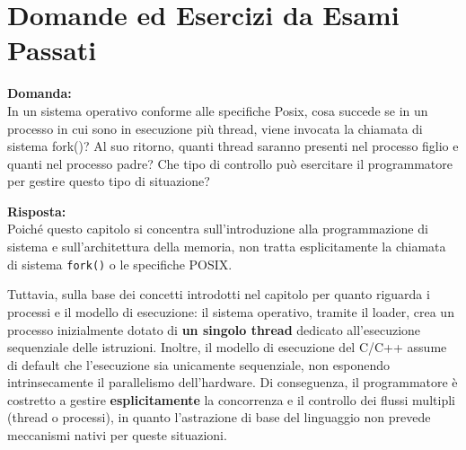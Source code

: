 \section{Domande ed Esercizi da Esami Passati}

\begin{exambox}
\textbf{Domanda:}\\
In un sistema operativo conforme alle specifiche Posix, cosa succede se in un processo in cui sono in esecuzione più thread, viene invocata la chiamata di sistema fork()? Al suo ritorno, quanti thread saranno presenti nel processo figlio e quanti nel processo padre? Che tipo di controllo può esercitare il programmatore per gestire questo tipo di situazione?

\vspace{1em}
\textbf{Risposta:}\\
Poiché questo capitolo si concentra sull'introduzione alla programmazione di sistema e sull'architettura della memoria, non tratta esplicitamente la chiamata di sistema \texttt{fork()} o le specifiche POSIX. 

Tuttavia, sulla base dei concetti introdotti nel capitolo per quanto riguarda i processi e il modello di esecuzione: il sistema operativo, tramite il loader, crea un processo inizialmente dotato di \textbf{un singolo thread} dedicato all'esecuzione sequenziale delle istruzioni. Inoltre, il modello di esecuzione del C/C++ assume di default che l'esecuzione sia unicamente sequenziale, non esponendo intrinsecamente il parallelismo dell'hardware. Di conseguenza, il programmatore è costretto a gestire \textbf{esplicitamente} la concorrenza e il controllo dei flussi multipli (thread o processi), in quanto l'astrazione di base del linguaggio non prevede meccanismi nativi per queste situazioni.
\end{exambox}
